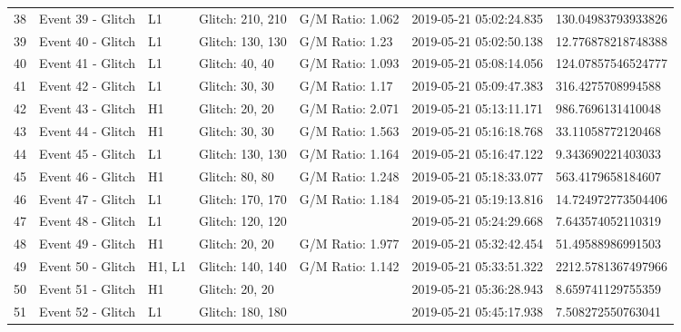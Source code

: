 \begin{longtable}{lllllll}
38 &                                  Event 39 - Glitch &       L1 &  Glitch: 210, 210 &  G/M Ratio: 1.062 &  2019-05-21 05:02:24.835 &  130.04983793933826 \\
39 &                                  Event 40 - Glitch &       L1 &  Glitch: 130, 130 &   G/M Ratio: 1.23 &  2019-05-21 05:02:50.138 &   12.776878218748388 \\
40 &                                  Event 41 - Glitch &       L1 &    Glitch: 40, 40 &  G/M Ratio: 1.093 &  2019-05-21 05:08:14.056 &  124.07857546524777 \\
41 &                                  Event 42 - Glitch &       L1 &    Glitch: 30, 30 &   G/M Ratio: 1.17 &  2019-05-21 05:09:47.383 &   316.4275708994588 \\
42 &                                  Event 43 - Glitch &       H1 &    Glitch: 20, 20 &  G/M Ratio: 2.071 &  2019-05-21 05:13:11.171 &   986.7696131410048 \\
43 &                                  Event 44 - Glitch &       H1 &    Glitch: 30, 30 &  G/M Ratio: 1.563 &  2019-05-21 05:16:18.768 &   33.11058772120468 \\
44 &                                  Event 45 - Glitch &       L1 &  Glitch: 130, 130 &  G/M Ratio: 1.164 &  2019-05-21 05:16:47.122 &   9.343690221403033 \\
45 &                                  Event 46 - Glitch &       H1 &    Glitch: 80, 80 &  G/M Ratio: 1.248 &  2019-05-21 05:18:33.077 &   563.4179658184607 \\
46 &                                  Event 47 - Glitch &       L1 &  Glitch: 170, 170 &  G/M Ratio: 1.184 &  2019-05-21 05:19:13.816 &  14.724972773504406 \\
47 &                                  Event 48 - Glitch &       L1 &  Glitch: 120, 120 &                   &  2019-05-21 05:24:29.668 &   7.643574052110319 \\
48 &                                  Event 49 - Glitch &       H1 &    Glitch: 20, 20 &  G/M Ratio: 1.977 &  2019-05-21 05:32:42.454 &   51.49588986991503 \\
49 &                                  Event 50 - Glitch &   H1, L1 &  Glitch: 140, 140 &  G/M Ratio: 1.142 &  2019-05-21 05:33:51.322 &  2212.5781367497966 \\
50 &                                  Event 51 - Glitch &       H1 &    Glitch: 20, 20 &                   &  2019-05-21 05:36:28.943 &   8.659741129755359 \\
51 &                                  Event 52 - Glitch &       L1 &  Glitch: 180, 180 &                   &  2019-05-21 05:45:17.938 &   7.508272550763041 \\

\end{longtable}
